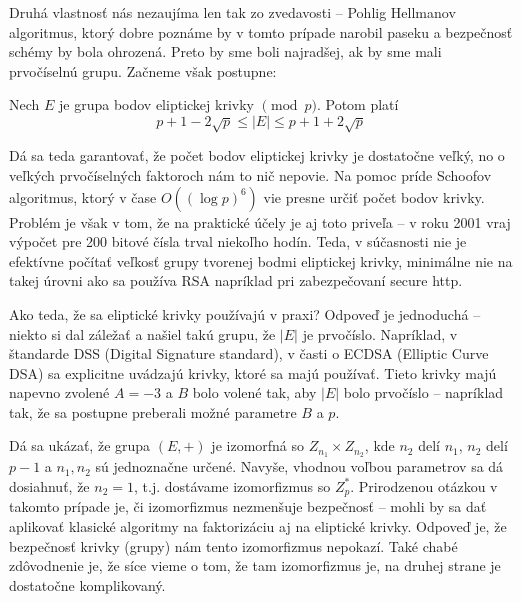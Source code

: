 Druhá vlastnosť nás nezaujíma len tak zo zvedavosti -- Pohlig Hellmanov
algoritmus, ktorý dobre poznáme by v tomto prípade narobil paseku a
bezpečnosť schémy by bola ohrozená. Preto by sme boli najradšej, ak by
sme mali prvočíselnú grupu. Začneme však postupne:

\begin{veta}
    Nech $E$ je grupa bodov eliptickej krivky $\pmod{p}$.
    Potom platí
    \begin{equation*}
        p + 1 - 2 \sqrt{p} \le |E| \le p + 1 + 2 \sqrt{p}
    \end{equation*}
\end{veta}

Dá sa teda garantovať, že počet bodov eliptickej krivky je dostatočne
veľký, no o veľkých prvočíselných faktoroch nám to nič nepovie.
Na pomoc príde Schoofov algoritmus, ktorý v čase
$O((\log{p})^6)$ vie presne určiť počet bodov krivky. Problém je však
v tom, že na praktické účely je aj toto priveľa -- v roku 2001 vraj
výpočet pre 200 bitové čísla trval niekoľho hodín. Teda, v súčasnosti
nie je efektívne počítať veľkosť grupy tvorenej bodmi eliptickej
krivky, minimálne nie na takej úrovni ako sa používa RSA napríklad pri
zabezpečovaní secure http.

Ako teda, že sa eliptické krivky používajú v praxi? Odpoveď je
jednoduchá -- niekto si dal záležať a našiel takú grupu, že $|E|$ je
prvočíslo. Napríklad, v štandarde DSS (Digital Signature standard), v
časti o ECDSA (Elliptic Curve DSA) sa explicitne uvádzajú krivky,
ktoré sa majú používať. Tieto krivky majú napevno zvolené $A=-3$ a $B$
bolo volené tak, aby $|E|$ bolo prvočíslo -- napríklad tak, že sa
postupne preberali možné parametre $B$ a $p$.

\begin{poznamka}
    Dá sa ukázať, že grupa $(E,+)$ je izomorfná so
    $Z_{n_1} \times Z_{n_2}$, kde $n_2$ delí $n_1$, $n_2$ delí $p-1$ a
    $n_1,n_2$ sú jednoznačne určené.
    Navyše, vhodnou voľbou parametrov sa dá dosiahnuť, že
    $n_2=1$, t.j. dostávame izomorfizmus so $Z_p^*$. Prirodzenou
    otázkou v takomto prípade je, či izomorfizmus nezmenšuje
    bezpečnosť -- mohli by sa dať aplikovať klasické algoritmy na
    faktorizáciu aj na eliptické krivky.
    Odpoveď je, že bezpečnosť krivky (grupy) nám tento izomorfizmus
    nepokazí. Také chabé zdôvodnenie je, že síce vieme o tom, že tam
    izomorfizmus je, na druhej strane je dostatočne komplikovaný.
\end{poznamka}

